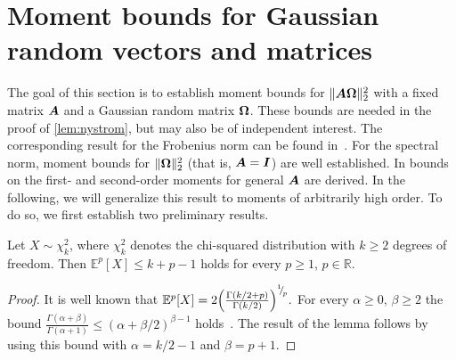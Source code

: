 \appendix

\section{Moment bounds for Gaussian random vectors and matrices}

The goal of this section is to establish moment bounds for $\lVert \boldsymbol{A} \boldsymbol{\Omega} \rVert _2^2$ with a fixed matrix $\boldsymbol{A}$ and a Gaussian random matrix $\boldsymbol{\Omega}$. These bounds are needed in the proof of \cref{lem:nystrom}, but may also be of independent interest.
The corresponding result for the Frobenius norm can be found in~\cite[Lemma 3]{kressner-2024-randomized-lowrank}. For the spectral norm, moment bounds for $\lVert \boldsymbol{\Omega} \rVert _2^2$ (that is, $\boldsymbol{A} = \boldsymbol{I}$) are well established\cite{chen-2005-condition-numbers, edelman-1988-eigenvalues-condition, james-1964-distributions-matrix}. In \cite[Lemma B.1]{tropp-2023-randomized-algorithms} bounds on the first- and second-order moments for general $\boldsymbol{A}$ are derived. In the following, we will generalize this result to moments of arbitrarily high order. To do so, we first establish two preliminary results.

\begin{lemma}\label{lem:gamma}
    Let $X \sim \chi_k^2$, where $\chi_k^2$ denotes the chi-squared distribution with $k \ge 2$ degrees of freedom. Then 
    $
        \mathbb{E}^{{p}}[X] \leq k + p-1
    $ holds for every $p \ge 1$, $p\in \mathbb R$.
\end{lemma}%
\begin{proof}
It is well known that
    $
        \mathbb{E}^{p}[X] = 2 \Big( \frac{\Gamma(k/2+p)}{\Gamma(k/2)} \Big)^{{}^{1}{\mskip -5mu/\mskip -3mu}_{p}}.
    $ For every $\alpha \ge 0$, $\beta \ge 2$ the bound $\frac{\Gamma(\alpha+\beta)}{\Gamma(\alpha + 1)} \le (\alpha+\beta/2)^{\beta-1}$ holds~\cite[Equation 2.2]{laforgia-1984-further-inequalities}. The result of the lemma follows by using this bound with $\alpha = k/2-1$ and $\beta = p+1$.
\end{proof}


